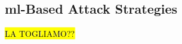 \documentclass[draftcls,onecolumn,12pt]{IEEEtran}
\newcommand{\Exp}[1]{\mathbb{E}\left[#1\right]}
\begin{document}

\subsection{\ac{ml}-Based Attack Strategies}
\label{sec:attack}
\hl{LA TOGLIAMO??}
\end{document}
